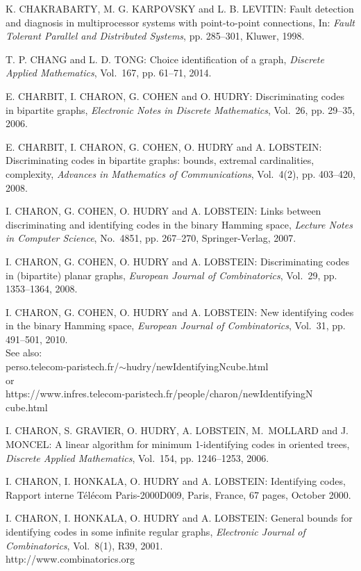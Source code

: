 \begin{thebibliography}{999}
K. CHAKRABARTY, M. G. KARPOVSKY and L. B. LEVITIN: Fault detection and diagnosis in multiprocessor systems with point-to-point connections, In: {\it Fault Tolerant Parallel and Distributed Systems}, pp. 285--301, Kluwer, 1998.

T. P. CHANG and L. D. TONG: Choice identification of a graph, {\it Discrete Applied Mathematics}, Vol.~167, pp. 61--71, 2014.

E. CHARBIT, I. CHARON, G. COHEN and O. HUDRY: Discriminating codes in bipartite graphs, {\it Electronic Notes in Discrete Mathematics}, Vol.~26, pp. 29--35, 2006.

E. CHARBIT, I. CHARON, G. COHEN, O. HUDRY and A. LOBSTEIN: Discriminating codes in bipartite graphs: bounds, extremal cardinalities, complexity, {\it Advances in Mathematics of Communications}, Vol.~4(2), pp. 403--420, 2008.

I. CHARON, G. COHEN, O. HUDRY and A. LOBSTEIN: Links between discriminating and identifying codes in the binary Hamming space, {\it Lecture Notes in Computer Science}, No.~4851, pp. 267--270, Springer-Verlag, 2007.

I. CHARON, G. COHEN, O. HUDRY and A. LOBSTEIN: Discriminating codes in (bipartite) planar graphs, {\it European Journal of Combinatorics}, Vol.~29, pp. 1353--1364, 2008.

  I. CHARON, G. COHEN, O. HUDRY and A. LOBSTEIN: New identifying codes in the binary Hamming space, {\it European Journal of Combinatorics}, Vol.~31, pp. 491--501, 2010.\\
See also: \\perso.telecom-paristech.fr/$\sim$hudry/newIdentifyingNcube.html\\or\\
https://www.infres.telecom-paristech.fr/people/charon/newIdentifyingN cube.html

I. CHARON, S. GRAVIER, O. HUDRY, A. LOBSTEIN, M.~MOLLARD and J. MONCEL: A linear algorithm for minimum 1-identifying codes in oriented trees, {\it Discrete Applied Mathematics}, Vol.~154, pp. 1246--1253, 2006.

I. CHARON, I. HONKALA, O. HUDRY and A. LOBSTEIN: Identifying codes, Rapport interne T\'el\'ecom Paris-2000D009, Paris, France, 67 pages, October 2000.

I. CHARON, I. HONKALA, O. HUDRY and A. LOBSTEIN: General bounds for identifying codes in some infinite regular graphs, {\it Electronic Journal of Combinatorics}, Vol.~8(1), R39, 2001.\\
http://www.combinatorics.org


\end{thebibliography}
